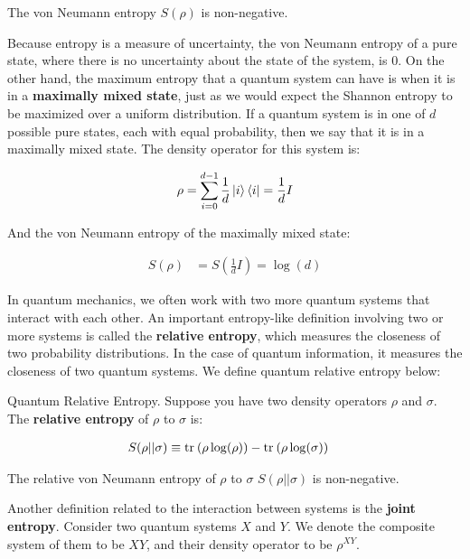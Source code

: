 \begin{remark}
    The von Neumann entropy $S(\rho)$ is non-negative.
\end{remark}

Because entropy is a measure of uncertainty, the von Neumann entropy of a pure state, where there is no uncertainty about the state of the system, is 0. On the other hand, the maximum entropy that a quantum system can have is when it is in a \textbf{maximally mixed state}, just as we would expect the Shannon entropy to be maximized over a uniform distribution. If a quantum system is in one of $d$ possible pure states, each with equal probability, then we say that it is in a maximally mixed state. The density operator for this system is:

\begin{align}
    \rho = \sum_{i=0}^{d-1} \frac{1}{d}\ket{i}\bra{i} = \frac{1}{d} I
\end{align}

And the von Neumann entropy of the maximally mixed state:

\begin{align}
    S(\rho) &= S(\tfrac{1}{d}I) = \log(d)
\end{align}

In quantum mechanics, we often work with two more quantum systems that interact with each other. An important entropy-like definition involving two or more systems is called the \textbf{relative entropy}, which measures the closeness of two probability distributions. In the case of quantum information, it measures the closeness of two quantum systems. We define quantum relative entropy below:

\begin{definition}{Quantum Relative Entropy.}
    Suppose you have two density operators $\rho$ and $\sigma$. The \textbf{relative entropy} of $\rho$ to $\sigma$ is:
    
    \begin{align}
        S(\rho||\sigma) &\equiv \text{tr}_{}\left( {\rho \log(\rho)} \right) - \text{tr}_{}\left( {\rho \log (\sigma)} \right)
    \end{align}
\end{definition}

\begin{remark}
    The relative von Neumann entropy of $\rho$ to $\sigma$ $S(\rho||\sigma)$ is non-negative.
\end{remark}

Another definition related to the interaction between systems is the \textbf{joint entropy}. Consider two quantum systems $X$ and $Y$. We denote the composite system of them to be $XY$, and their density operator to be $\rho^{XY}$.


